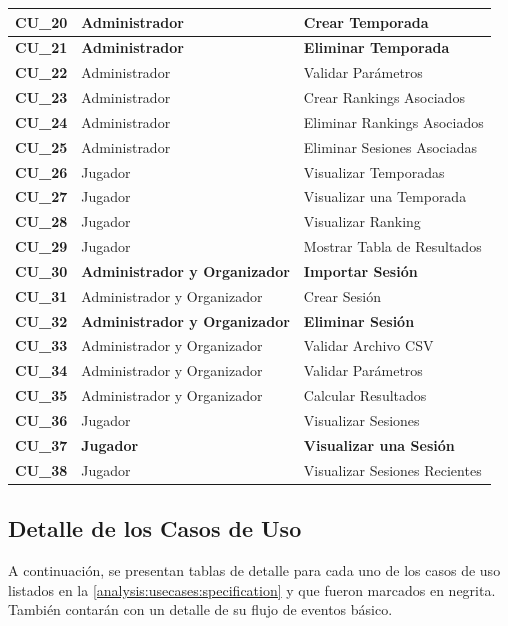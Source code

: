 \begin{center}
\begin{tabular}{| p{1.5cm} | p{6.5cm} | p{5.5cm} |}
    {\textbf{CU\_20}} & \textbf{Administrador} & \textbf{Crear Temporada}\\ \hline
    {\textbf{CU\_21}} & \textbf{Administrador} & \textbf{Eliminar Temporada}\\ \hline
    {\textbf{CU\_22}} & Administrador & Validar Parámetros\\\hline
    {\textbf{CU\_23}} & Administrador & Crear Rankings Asociados\\ \hline
    {\textbf{CU\_24}} & Administrador & Eliminar Rankings Asociados\\ \hline
    {\textbf{CU\_25}} & Administrador & Eliminar Sesiones Asociadas\\ \hline
    
    {\textbf{CU\_26}} & Jugador & Visualizar Temporadas\\ \hline
    {\textbf{CU\_27}} & Jugador & Visualizar una Temporada\\ \hline
    {\textbf{CU\_28}} & Jugador & Visualizar Ranking\\ \hline
    {\textbf{CU\_29}} & Jugador & Mostrar Tabla de Resultados\\ \hline
    
    {\textbf{CU\_30}} & \textbf{Administrador y Organizador} & \textbf{Importar Sesión}\\ \hline
    {\textbf{CU\_31}} & Administrador y Organizador & Crear Sesión\\ \hline
    {\textbf{CU\_32}} & \textbf{Administrador y Organizador} & \textbf{Eliminar Sesión}\\ \hline
    {\textbf{CU\_33}} & Administrador y Organizador & Validar Archivo CSV\\ \hline
    {\textbf{CU\_34}} & Administrador y Organizador & Validar Parámetros\\ \hline
    {\textbf{CU\_35}} & Administrador y Organizador & Calcular Resultados\\ \hline
    
    {\textbf{CU\_36}} & Jugador & Visualizar Sesiones\\ \hline
    {\textbf{CU\_37}} & \textbf{Jugador} & \textbf{Visualizar una Sesión}\\ \hline
    {\textbf{CU\_38}} & Jugador & Visualizar Sesiones Recientes\\ \hline
  \end{tabular}
\end{center}

\subsection{Detalle de los Casos de Uso}
A continuación, se presentan tablas de detalle para cada uno de los casos de uso listados en la \autoref{analysis:usecases:specification} y que fueron marcados en negrita. También contarán con un detalle de su flujo de eventos básico.

